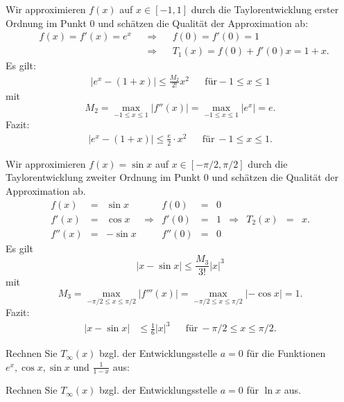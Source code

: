 \begin{bsp}
	Wir approximieren $f(x)$ auf $x \in [-1,1]$ durch die Taylorentwicklung erster Ordnung im Punkt $0$ und schätzen die Qualität der Approximation ab: 
	\begin{align*}
		& f(x)  = f'(x) = e^x & & \Longrightarrow & & f(0)  = f'(0) = 1  \\ 
		& & & \Longrightarrow &  & T_1(x) = f(0) + f'(0) x = 1 + x. 
	\end{align*}
	Es gilt: 
	\begin{align*}
		| e^x - (1+x) | \le \frac{M_2}{2!} x^2 & & \text{für} -1 \le x \le 1
	\end{align*}
	mit 
	\[
		M_2 = \max_{-1 \le x \le 1} |f''(x)| = \max_{-1 \le x \le 1} | e^x | = e.
	\]
	Fazit: 
	\begin{align*}
		|e^x - (1+x)| \le \frac{e}{2} \cdot x^2 & & \text{für} \ -1 \le x \le 1.
	\end{align*}
\end{bsp} 

\begin{bsp} 
	Wir approximieren $f(x) = \sin x$ auf $x \in [-\pi/2,\pi/2]$ durch die Taylorentwicklung zweiter Ordnung im Punkt $0$ und schätzen die Qualität der Approximation ab. 
	\[
		\begin{array}{|ccc|c|ccc|cccc}
		f(x) & = & \sin x &  &  f(0) & = & 0 & \\ 
		f'(x)  & = & \cos x & \Longrightarrow & f'(0) & =   & 1 & \Longrightarrow & T_2(x) &  = & x. \\ 
		f''(x)  & =  & - \sin x &  &  f''(0) & = & 0 &
		\end{array} 
	\]
	Es gilt
	\[
		|x - \sin x| \le \frac{M_3}{3!} |x|^3
	\]
	mit 
	\[
		M_3 = \max_{-\pi/2 \le x \le \pi/ 2} | f'''(x) | = \max_{-\pi/2 \le x \le \pi / 2} | - \cos x| = 1.
	\]
	Fazit: 
	\begin{align*}
			|x - \sin x| & \le \frac{1}{6} |x|^3 & & \text{für} \ -\pi/2 \le x \le \pi/2. 
	\end{align*}
\end{bsp} 

\begin{aufg}
	Rechnen Sie $T_\infty(x)$ bzgl. der Entwicklungsstelle $a=0$ für die  Funktionen $e^x, \cos x, \sin x$ und $\frac{1}{1-x}$ aus: 
\end{aufg} 

\begin{aufg}
	Rechnen Sie $T_\infty(x)$ bzgl. der Entwicklungsstelle $a=0$ für $\ln x$ aus. 
\end{aufg} 

